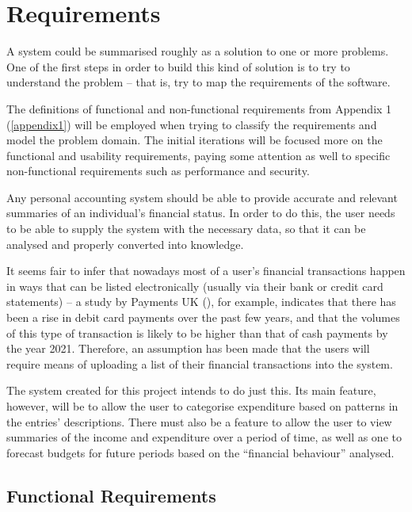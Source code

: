 \section{Requirements} \label{sec:Requirements}
A system could be summarised roughly as a solution to one or more problems. One
of the first steps in order to build this kind of solution is to try to
understand the problem -- that is, try to map the requirements of the software. 

The definitions of functional and non-functional requirements from Appendix 1
(\ref{appendix1}) will be employed when trying to classify the requirements and
model the problem domain. The initial iterations will be focused more on the
functional and usability requirements, paying some attention as well to
specific non-functional requirements such as performance and security.

Any personal accounting system should be able to provide accurate and relevant
summaries of an individual's financial status. In order to do this, the user
needs to be able to supply the system with the necessary data, so that it can
be analysed and properly converted into knowledge.

It seems fair to infer that nowadays most of a user's financial transactions
happen in ways that can be listed electronically (usually via their bank or
credit card statements) -- a study by Payments UK
(\citeyear{paymentsUK2017summary}), for example, indicates that there has been
a rise in debit card payments over the past few years, and that the volumes of
this type of transaction is likely to be higher than that of cash payments by
the year 2021. Therefore, an assumption has been made that the users will
require means of uploading a list of their financial transactions into the
system.

The system created for this project intends to do just this. Its main feature,
however, will be to allow the user to categorise expenditure based on patterns
in the entries' descriptions. There must also be a feature to allow the user to
view summaries of the income and expenditure over a period of time, as well as
one to forecast budgets for future periods based on the ``financial behaviour''
analysed.

\subsection{Functional Requirements} \label{sec:Requirements.FunctionalRequirements}

